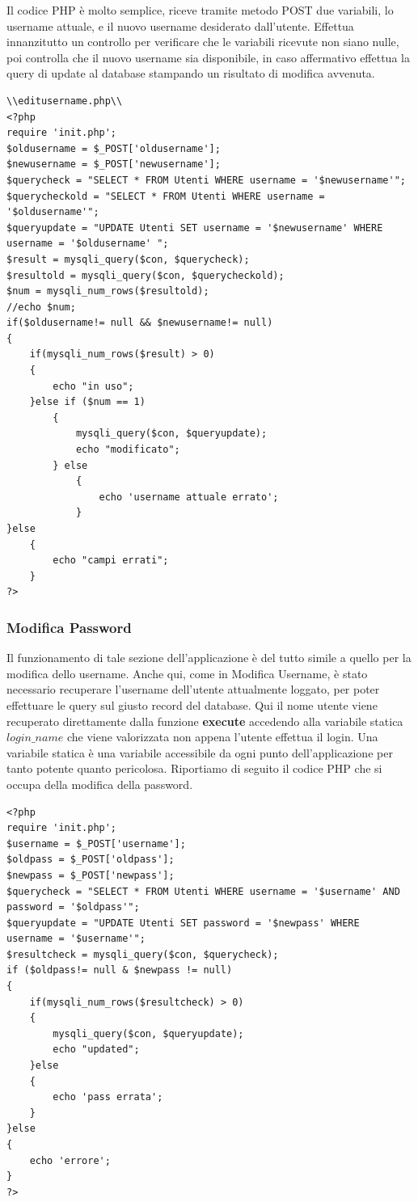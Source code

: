\documentclass[a4paper, 50pt, twoside]{article}
\begin{document}
Il codice PHP è molto semplice, riceve tramite metodo POST due variabili, lo username attuale, e il nuovo username desiderato dall'utente. Effettua innanzitutto un controllo per verificare che le variabili ricevute non siano nulle, poi controlla che il nuovo username sia disponibile, in caso affermativo effettua la query di update al database stampando un risultato di modifica avvenuta.
\begin{lstlisting}
\\editusername.php\\
<?php 
require 'init.php';
$oldusername = $_POST['oldusername'];
$newusername = $_POST['newusername'];
$querycheck = "SELECT * FROM Utenti WHERE username = '$newusername'";
$querycheckold = "SELECT * FROM Utenti WHERE username = '$oldusername'";
$queryupdate = "UPDATE Utenti SET username = '$newusername' WHERE username = '$oldusername' ";
$result = mysqli_query($con, $querycheck);
$resultold = mysqli_query($con, $querycheckold);
$num = mysqli_num_rows($resultold);
//echo $num;
if($oldusername!= null && $newusername!= null)
{
	if(mysqli_num_rows($result) > 0)
    {
    	echo "in uso";
    }else if ($num == 1)
    	{	
        	mysqli_query($con, $queryupdate);
        	echo "modificato";
        } else
        	{
            	echo 'username attuale errato'; 
            }
}else
	{
    	echo "campi errati";
    }
?>
\end{lstlisting}
\subsubsection{Modifica Password}
Il funzionamento di tale sezione dell’applicazione è del tutto simile a quello per la modifica dello username. Anche qui, come in Modifica Username, è stato necessario recuperare l'username dell'utente attualmente loggato, per poter effettuare le query sul giusto record del database. Qui il nome utente viene recuperato direttamente dalla funzione \textbf{execute} accedendo alla variabile statica $login\_name$ che viene valorizzata non appena l'utente effettua il login. Una variabile statica è una variabile accessibile da ogni punto dell'applicazione per tanto potente quanto pericolosa. Riportiamo di seguito il codice PHP che si occupa della modifica della password.
\begin{lstlisting}
<?php
require 'init.php';
$username = $_POST['username'];
$oldpass = $_POST['oldpass'];
$newpass = $_POST['newpass'];
$querycheck = "SELECT * FROM Utenti WHERE username = '$username' AND 
password = '$oldpass'";
$queryupdate = "UPDATE Utenti SET password = '$newpass' WHERE 
username = '$username'";
$resultcheck = mysqli_query($con, $querycheck);
if ($oldpass!= null & $newpass != null)
{
	if(mysqli_num_rows($resultcheck) > 0)
    {
    	mysqli_query($con, $queryupdate);
        echo "updated";
    }else 
    {
    	echo 'pass errata';
    }
}else
{
	echo 'errore';
}
?>
\end{lstlisting}
\end{document}
